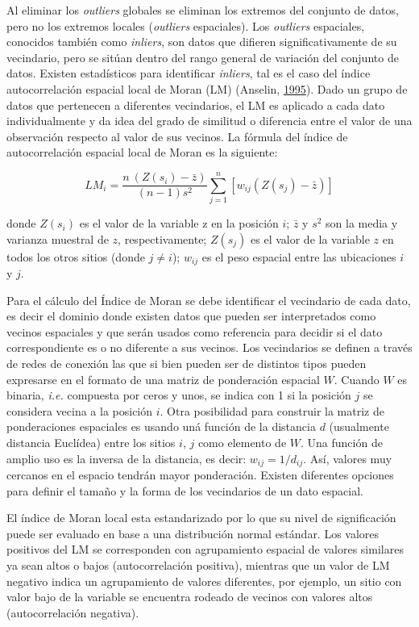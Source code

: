 \documentclass[11pt,b5paper,]{krantz}
\begin{document}
Al eliminar los \emph{outliers} globales se eliminan los extremos del conjunto de datos, pero no los extremos locales (\emph{outliers} espaciales). Los \emph{outliers} espaciales, conocidos también como \emph{inliers}, son datos que difieren significativamente de su vecindario, pero se sitúan dentro del rango general de variación del conjunto de datos. Existen estadísticos para identificar \emph{inliers}, tal es el caso del índice autocorrelación espacial local de Moran (LM) (Anselin, \protect\hyperlink{ref-Anselin_1995}{1995}). Dado un grupo de datos que pertenecen a diferentes vecindarios, el LM es aplicado a cada dato individualmente y da idea del grado de similitud o diferencia entre el valor de una observación respecto al valor de sus vecinos. La fórmula del índice de autocorrelación espacial local de Moran es la siguiente:

\[{LM}_i=\frac{n\ (Z(s_i)-\bar{z})}{(n-1)s^2}\sum_{j=1}^{n}\left[w_{ij}\left(Z(s_j)-\bar{z}\right)\right]\]

donde \(Z(s_i)\) es el valor de la variable z en la posición \(i\); \(\bar{z}\) y \(s^2\) son la media y varianza muestral de \(z\), respectivamente; \(Z(s_j)\) es el valor de la variable \(z\) en todos los otros sitios (donde \(j\neq i\)); \(w_{ij}\) es el peso espacial entre las ubicaciones \(i\) y \(j\).

Para el cálculo del Índice de Moran se debe identificar el vecindario de cada dato, es decir el dominio donde existen datos que pueden ser interpretados como vecinos espaciales y que serán usados como referencia para decidir si el dato correspondiente es o no diferente a sus vecinos. Los vecindarios se definen a través de redes de conexión las que si bien pueden ser de distintos tipos pueden expresarse en el formato de una matriz de ponderación espacial \(W\). Cuando \(W\) es binaria, \emph{i.e.} compuesta por ceros y unos, se indica con 1 si la posición \(j\) se considera vecina a la posición \(i\). Otra posibilidad para construir la matriz de ponderaciones espaciales es usando uná función de la distancia \(d\) (usualmente distancia Euclídea) entre los sitios \(i\), \(j\) como elemento de \(W\). Una función de amplio uso es la inversa de la distancia, es decir: \(w_{ij}=1/d_{ij}\). Así, valores muy cercanos en el espacio tendrán mayor ponderación. Existen diferentes opciones para definir el tamaño y la forma de los vecindarios de un dato espacial.

El índice de Moran local esta estandarizado por lo que su nivel de significación puede ser evaluado en base a una distribución normal estándar. Los valores positivos del LM se corresponden con agrupamiento espacial de valores similares ya sean altos o bajos (autocorrelación positiva), mientras que un valor de LM negativo indica un agrupamiento de valores diferentes, por ejemplo, un sitio con valor bajo de la variable se encuentra rodeado de vecinos con valores altos (autocorrelación negativa).
\end{document}
